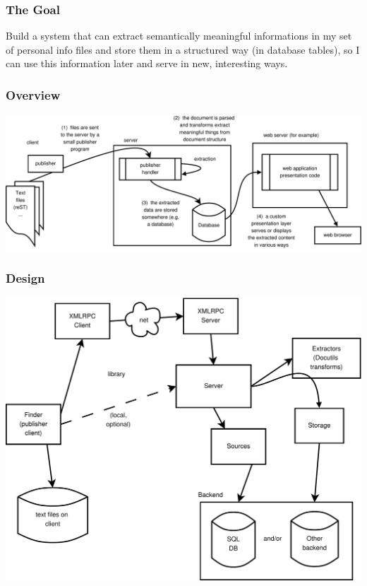 \documentclass{beamer}
\begin{document}
\begin{frame}[fragile]
  \frametitle{The Goal}

  Build a system that can extract semantically meaningful informations in my set
  of personal info files and store them in a structured way (in database
  tables), so I can use this information later and serve in new, interesting
  ways.

\end{frame}



\begin{frame}[fragile]
  \frametitle{Overview}

\includegraphics[width=1.0\textwidth]{../nabu2.pdf}

\end{frame}



\begin{frame}[fragile]
  \frametitle{Design}

\includegraphics[width=1.0\textwidth]{../nabu1.pdf}

\end{frame}
\end{document}
